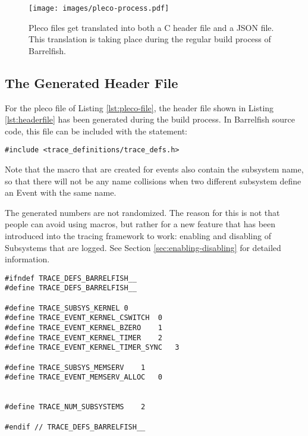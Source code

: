 \documentclass[a4paper,11pt,twoside]{report}
\begin{document}
\begin{figure}[t]
	\begin{center}
		\texttt{[image: images/pleco-process.pdf]}
	\end{center}
	\caption{Pleco files get translated into both a C header file and a JSON
	file. This translation is taking place during the regular build process of
Barrelfish.}
	\label{fig:pleco-process}
\end{figure}

\subsection{The Generated Header File}

For the pleco file of Listing \ref{lst:pleco-file}, the header file shown in
Listing \ref{lst:headerfile} has been generated during the build process. In
Barrelfish source code, this file can be included with the statement:

\begin{lstlisting}
#include <trace_definitions/trace_defs.h>
\end{lstlisting}

Note that the macro that are created for events also contain the subsystem name,
so that there will not be any name collisions when two different subsystem
define an Event with the same name.

The generated numbers are not randomized. The reason for this is not that people
can avoid using macros, but rather for a new feature that has been introduced
into the tracing framework to work: enabling and disabling of Subsystems that
are logged. See Section \ref{sec:enabling-disabling} for detailed information.

\begin{code}
\begin{lstlisting}[frame=single, caption={A header file that has been generated
	based on the pleco file shown in Listing \ref{lst:pleco-file}.}, label={lst:headerfile}]
#ifndef TRACE_DEFS_BARRELFISH__
#define TRACE_DEFS_BARRELFISH__

#define TRACE_SUBSYS_KERNEL 0
#define TRACE_EVENT_KERNEL_CSWITCH  0
#define TRACE_EVENT_KERNEL_BZERO    1
#define TRACE_EVENT_KERNEL_TIMER    2
#define TRACE_EVENT_KERNEL_TIMER_SYNC   3

#define TRACE_SUBSYS_MEMSERV    1
#define TRACE_EVENT_MEMSERV_ALLOC   0


#define TRACE_NUM_SUBSYSTEMS    2

#endif // TRACE_DEFS_BARRELFISH__

\end{lstlisting}
\end{code}
\end{document}
